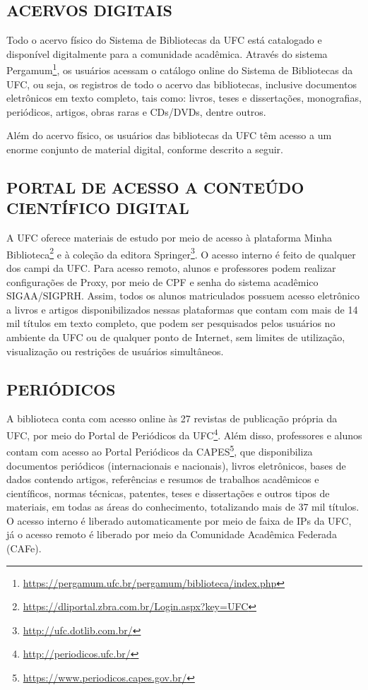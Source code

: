 \subsection{ACERVOS DIGITAIS}

Todo o acervo físico do Sistema de Bibliotecas da UFC está catalogado e disponível digitalmente para a comunidade acadêmica. Através do sistema Pergamum\footnote{\url{https://pergamum.ufc.br/pergamum/biblioteca/index.php}}, os usuários acessam o catálogo online do Sistema de Bibliotecas da UFC, ou seja, os registros de todo o acervo das bibliotecas, inclusive documentos eletrônicos em texto completo, tais como: livros, teses e dissertações, monografias, periódicos, artigos, obras raras e CDs/DVDs, dentre outros.

Além do acervo físico, os usuários das bibliotecas da UFC têm acesso a um enorme conjunto de material digital, conforme descrito a seguir.

\subsection{PORTAL DE ACESSO A CONTEÚDO CIENTÍFICO DIGITAL}

A UFC oferece materiais de estudo por meio de acesso à plataforma Minha Biblioteca\footnote{\url{https://dliportal.zbra.com.br/Login.aspx?key=UFC}} e à coleção da editora Springer\footnote{\url{http://ufc.dotlib.com.br/}}. O acesso interno é feito de qualquer dos campi da UFC. Para acesso remoto, alunos e professores podem realizar configurações de Proxy, por meio de CPF e senha do sistema acadêmico SIGAA/SIGPRH. Assim, todos os alunos matriculados possuem acesso eletrônico a livros e artigos disponibilizados nessas plataformas que contam com mais de 14 mil títulos em texto completo, que podem ser pesquisados pelos usuários no ambiente da UFC ou de qualquer ponto de Internet, sem limites de utilização, visualização ou restrições de usuários simultâneos.

\subsection{PERIÓDICOS}

A biblioteca conta com acesso online às 27 revistas de publicação própria da UFC, por meio do Portal de Periódicos da UFC\footnote{\url{http://periodicos.ufc.br/}}. Além disso, professores e alunos contam com acesso ao Portal Periódicos da CAPES\footnote{\url{https://www.periodicos.capes.gov.br/}}, que disponibiliza documentos periódicos (internacionais e nacionais), livros eletrônicos, bases de dados contendo artigos, referências e resumos de trabalhos acadêmicos e científicos, normas técnicas, patentes, teses e dissertações e outros tipos de materiais, em todas as áreas do conhecimento, totalizando mais de 37 mil títulos. O acesso interno é liberado automaticamente por meio de faixa de IPs da UFC, já o acesso remoto é liberado por meio da Comunidade Acadêmica Federada (CAFe).

